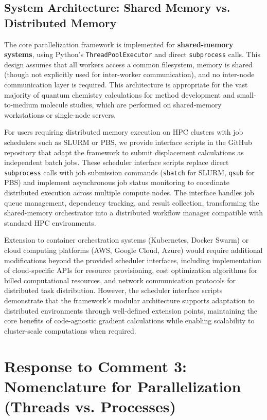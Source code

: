 \documentclass[11pt]{article}
\begin{document}
\subsection{System Architecture: Shared Memory vs. Distributed Memory}

The core parallelization framework is implemented for \textbf{shared-memory systems}, using Python's \texttt{ThreadPoolExecutor} and direct \texttt{subprocess} calls. This design assumes that all workers access a common filesystem, memory is shared (though not explicitly used for inter-worker communication), and no inter-node communication layer is required. This architecture is appropriate for the vast majority of quantum chemistry calculations for method development and small-to-medium molecule studies, which are performed on shared-memory workstations or single-node servers.

For users requiring distributed memory execution on HPC clusters with job schedulers such as SLURM or PBS, we provide interface scripts in the GitHub repository that adapt the framework to submit displacement calculations as independent batch jobs. These scheduler interface scripts replace direct \texttt{subprocess} calls with job submission commands (\texttt{sbatch} for SLURM, \texttt{qsub} for PBS) and implement asynchronous job status monitoring to coordinate distributed execution across multiple compute nodes. The interface handles job queue management, dependency tracking, and result collection, transforming the shared-memory orchestrator into a distributed workflow manager compatible with standard HPC environments.

Extension to container orchestration systems (Kubernetes, Docker Swarm) or cloud computing platforms (AWS, Google Cloud, Azure) would require additional modifications beyond the provided scheduler interfaces, including implementation of cloud-specific APIs for resource provisioning, cost optimization algorithms for billed computational resources, and network communication protocols for distributed task distribution. However, the scheduler interface scripts demonstrate that the framework's modular architecture supports adaptation to distributed environments through well-defined extension points, maintaining the core benefits of code-agnostic gradient calculations while enabling scalability to cluster-scale computations when required.

\section{Response to Comment 3: Nomenclature for Parallelization (Threads vs. Processes)}
\end{document}

